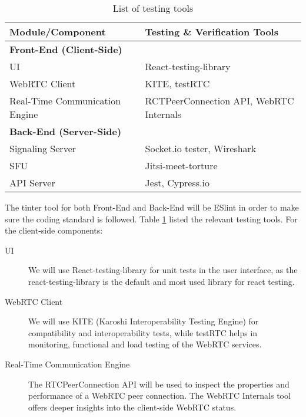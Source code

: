 \documentclass[12pt, titlepage]{article}
\begin{document}
\begin{table}[h]
  \centering
  \begin{tabularx}{1.0\linewidth}{ll} \toprule
    \textbf{Module/Component}            & \textbf{Testing \& Verification Tools}        \\ \midrule
    \multicolumn{2}{l}{\textbf{Front-End (Client-Side)}}                                    \\
    UI                             & React-testing-library                   \\
    WebRTC Client                  & KITE, testRTC                           \\
    Real-Time Communication Engine & RCTPeerConnection API, WebRTC Internals \\ \midrule
    \multicolumn{2}{l}{\textbf{Back-End (Server-Side)}}                                     \\
    Signaling Server               & Socket.io tester, Wireshark             \\
    SFU                            & Jitsi-meet-torture                      \\
    API Server                     & Jest, Cypress.io                        \\ \bottomrule
  \end{tabularx}
  \caption{List of testing tools}
  \label{tab:testingtools}
\end{table}

The tinter tool for both Front-End and Back-End will be ESlint in order to make
sure the coding standard is followed. Table \ref{tab:testingtools} listed the
relevant testing tools. For the client-side components:
\begin{description}
\item[UI] We will use React-testing-library for unit tests in the user interface,
  as the react-testing-library is the default and most used library for react
  testing.
\item[WebRTC Client] We will use KITE (Karoshi Interoperability Testing Engine)
  for compatibility and interoperability tests, while testRTC helps in
  monitoring, functional and load testing of the WebRTC services.
\item[Real-Time Communication Engine] The RTCPeerConnection API will be used to
  inspect the properties and performance of a WebRTC peer connection. The WebRTC
  Internals tool offers deeper insights into the client-side WebRTC status.
\end{description}
\end{document}
